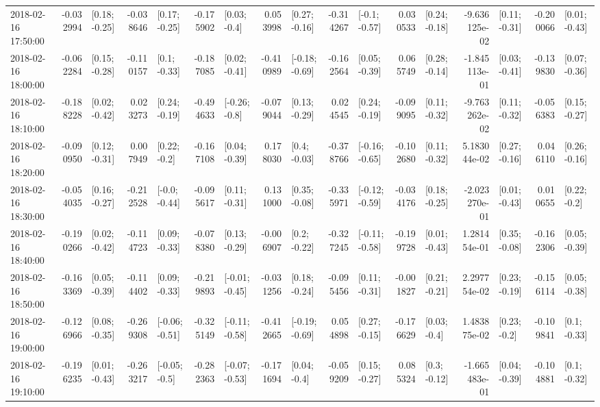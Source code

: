 \begin{tabular}{lrlrlrlrlrlrlrlrl}
2018-02-16 17:50:00 & -0.032994 &   [0.18; -0.25] & -0.038646 &   [0.17; -0.25] & -0.175902 &    [0.03; -0.4] &  0.053998 &   [0.27; -0.16] & -0.314267 &   [-0.1; -0.57] &  0.030533 &   [0.24; -0.18] & -9.636125e-02 &   [0.11; -0.31] & -0.200066 &   [0.01; -0.43] \\
2018-02-16 18:00:00 & -0.062284 &   [0.15; -0.28] & -0.110157 &    [0.1; -0.33] & -0.187085 &   [0.02; -0.41] & -0.410989 &  [-0.18; -0.69] & -0.162564 &   [0.05; -0.39] &  0.065749 &   [0.28; -0.14] & -1.845113e-01 &   [0.03; -0.41] & -0.139830 &   [0.07; -0.36] \\
2018-02-16 18:10:00 & -0.188228 &   [0.02; -0.42] &  0.023273 &   [0.24; -0.19] & -0.494633 &   [-0.26; -0.8] & -0.079044 &   [0.13; -0.29] &  0.024545 &   [0.24; -0.19] & -0.099095 &   [0.11; -0.32] & -9.763262e-02 &   [0.11; -0.32] & -0.056383 &   [0.15; -0.27] \\
2018-02-16 18:20:00 & -0.090950 &   [0.12; -0.31] &  0.007949 &    [0.22; -0.2] & -0.167108 &   [0.04; -0.39] &  0.178030 &    [0.4; -0.03] & -0.378766 &  [-0.16; -0.65] & -0.102680 &   [0.11; -0.32] &  5.183044e-02 &   [0.27; -0.16] &  0.046110 &   [0.26; -0.16] \\
2018-02-16 18:30:00 & -0.054035 &   [0.16; -0.27] & -0.212528 &   [-0.0; -0.44] & -0.095617 &   [0.11; -0.31] &  0.131000 &   [0.35; -0.08] & -0.335971 &  [-0.12; -0.59] & -0.034176 &   [0.18; -0.25] & -2.023270e-01 &   [0.01; -0.43] &  0.010655 &    [0.22; -0.2] \\
2018-02-16 18:40:00 & -0.190266 &   [0.02; -0.42] & -0.114723 &   [0.09; -0.33] & -0.078380 &   [0.13; -0.29] & -0.006907 &    [0.2; -0.22] & -0.327245 &  [-0.11; -0.58] & -0.199728 &   [0.01; -0.43] &  1.281454e-01 &   [0.35; -0.08] & -0.162306 &   [0.05; -0.39] \\
2018-02-16 18:50:00 & -0.163369 &   [0.05; -0.39] & -0.114402 &   [0.09; -0.33] & -0.219893 &  [-0.01; -0.45] & -0.031256 &   [0.18; -0.24] & -0.095456 &   [0.11; -0.31] & -0.001827 &   [0.21; -0.21] &  2.297754e-02 &   [0.23; -0.19] & -0.156114 &   [0.05; -0.38] \\
2018-02-16 19:00:00 & -0.126966 &   [0.08; -0.35] & -0.269308 &  [-0.06; -0.51] & -0.325149 &  [-0.11; -0.58] & -0.412665 &  [-0.19; -0.69] &  0.054898 &   [0.27; -0.15] & -0.176629 &    [0.03; -0.4] &  1.483875e-02 &    [0.23; -0.2] & -0.109841 &    [0.1; -0.33] \\
2018-02-16 19:10:00 & -0.196235 &   [0.01; -0.43] & -0.263217 &   [-0.05; -0.5] & -0.282363 &  [-0.07; -0.53] & -0.171694 &    [0.04; -0.4] & -0.059209 &   [0.15; -0.27] &  0.085324 &    [0.3; -0.12] & -1.665483e-01 &   [0.04; -0.39] & -0.104881 &    [0.1; -0.32] \\

\end{tabular}
